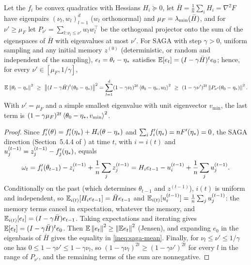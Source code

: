 \begin{proposition}
\label{prop:sagamean}
Let the $f_i$ be convex quadratics with Hessians $H_i\succeq0$, let $\bar H=\frac1n\sum_iH_i=\nabla^2F$ have eigenpairs $(\nu_l,w_l)_{l=1}^d$ ($w_l$ orthonormal) and $\mu_F=\lambda_{\min}(\bar H)$, and for $\nu'\ge\mu_F$ let $P_{\nu'}=\sum_{l:\nu_l\le\nu'}w_lw_l^\top$ be the orthogonal projector onto the sum of the eigenspaces of $\bar H$ with eigenvalues at most $\nu'$. For SAGA with step $\gamma>0$, uniform sampling and any initial memory $z^{(0)}$ (deterministic, or random and independent of the sampling), $e_t=\theta_t-\eta_\ast$ satisfies $\mathbb{E}[e_t]=(I-\gamma\bar H)^te_0$; hence, for every $\nu'\in[\mu_F,1/\gamma]$,
\begin{equation}
\label{ineq:saga-mean}
\E\norm{\theta_t-\etastar}^2\ \ge\ \norm{(I-\gamma\bar H)^t(\theta_0-\etastar)}^2=\sum_{l=1}^d(1-\gamma\nu_l)^{2t}\inner{\theta_0-\etastar}{w_l}^2\ \ge\ (1-\gamma\nu')^{2t}\norm{P_{\nu'}(\theta_0-\etastar)}^2 .
\end{equation}
With $\nu'=\mu_F$ and a simple smallest eigenvalue with unit eigenvector $v_{\min}$, the last term is $(1-\gamma\mu_F)^{2t}\left\langle \theta_0-\eta_\ast, v_{\min} \right\rangle^2$.
\end{proposition}

\begin{proof}
Since $f'_i(\theta)=f'_i(\eta_\ast)+H_i(\theta-\eta_\ast)$ and $\sum_if'_i(\eta_\ast)=nF'(\eta_\ast)=0$, the SAGA direction (Section~5.4.4 of \cite{bach2024learning}) at time $t$, with $i=i(t)$ and $u_j^{(t-1)}=z_j^{(t-1)}-f'_j(\eta_\ast)$, equals
\[
\omega_t=f'_i(\theta_{t-1})-z_i^{(t-1)}+\frac1n\sum_jz_j^{(t-1)}=H_ie_{t-1}-u_i^{(t-1)}+\frac1n\sum_ju_j^{(t-1)} .
\]
Conditionally on the past (which determines $\theta_{t-1}$ and $z^{(t-1)}$), $i(t)$ is uniform and independent, so $\mathbb{E}_{i(t)}[H_ie_{t-1}]=\bar He_{t-1}$ and $\mathbb{E}_{i(t)}[u^{(t-1)}_{i}]=\frac1n\sum_ju_j^{(t-1)}$: the memory terms cancel in expectation, whatever the memory, and $\mathbb{E}_{i(t)}[e_t]=(I-\gamma\bar H)e_{t-1}$. Taking expectations and iterating gives $\mathbb{E}[e_t]=(I-\gamma\bar H)^te_0$. Then $\mathbb{E}\left\|e_t\right\|^2\ge\left\|\mathbb{E} e_t\right\|^2$ (Jensen), and expanding $e_0$ in the eigenbasis of $\bar H$ gives the equality in \eqref{ineq:saga-mean}. Finally, for $\nu_l\le\nu'\le1/\gamma$ one has $0\le1-\gamma\nu'\le1-\gamma\nu_l$, so $(1-\gamma\nu_l)^{2t}\ge(1-\gamma\nu')^{2t}$ for every $l$ in the range of $P_{\nu'}$, and the remaining terms of the sum are nonnegative.
\end{proof}

